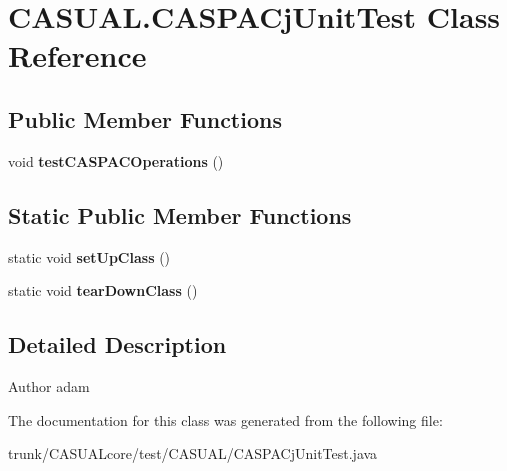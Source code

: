 \hypertarget{classCASUAL_1_1CASPACjUnitTest}{\section{C\-A\-S\-U\-A\-L.\-C\-A\-S\-P\-A\-Cj\-Unit\-Test Class Reference}
\label{classCASUAL_1_1CASPACjUnitTest}
}
\subsection*{Public Member Functions}
\begin{DoxyCompactItemize}
\item 
\hypertarget{classCASUAL_1_1CASPACjUnitTest_a5970d891918d6e696f949f1cd8d838e6}{void {\bfseries test\-C\-A\-S\-P\-A\-C\-Operations} ()}\label{classCASUAL_1_1CASPACjUnitTest_a5970d891918d6e696f949f1cd8d838e6}

\end{DoxyCompactItemize}
\subsection*{Static Public Member Functions}
\begin{DoxyCompactItemize}
\item 
\hypertarget{classCASUAL_1_1CASPACjUnitTest_a567c4df41861b0f66301e81a4fa80d1e}{static void {\bfseries set\-Up\-Class} ()}\label{classCASUAL_1_1CASPACjUnitTest_a567c4df41861b0f66301e81a4fa80d1e}

\item 
\hypertarget{classCASUAL_1_1CASPACjUnitTest_aae59acf2bb710e6a7b0a4b8aec5f53a2}{static void {\bfseries tear\-Down\-Class} ()}\label{classCASUAL_1_1CASPACjUnitTest_aae59acf2bb710e6a7b0a4b8aec5f53a2}

\end{DoxyCompactItemize}


\subsection{Detailed Description}
\begin{DoxyAuthor}{Author}
adam 
\end{DoxyAuthor}


The documentation for this class was generated from the following file\-:\begin{DoxyCompactItemize}
\item 
trunk/\-C\-A\-S\-U\-A\-Lcore/test/\-C\-A\-S\-U\-A\-L/C\-A\-S\-P\-A\-Cj\-Unit\-Test.\-java\end{DoxyCompactItemize}
